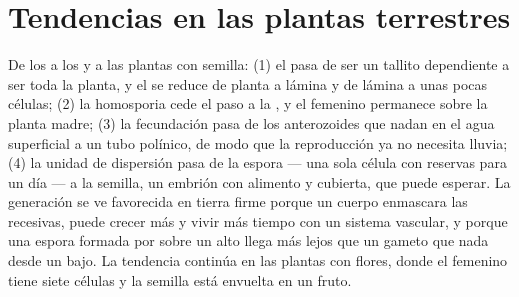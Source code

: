 \section{Tendencias en las plantas terrestres}

\begin{proposition}\label{prop:b2:plant-life-cycles:trends}
De los  a los  y a las plantas con semilla: (1) el
 pasa de ser un tallito dependiente a ser toda la planta, y el
 se reduce de planta a lámina y de lámina a unas pocas
células; (2) la homosporia cede el paso a la , y el
 femenino permanece sobre la planta madre; (3) la fecundación
pasa de los anterozoides que nadan en el agua superficial a un tubo
polínico, de modo que la reproducción ya no necesita lluvia; (4) la
unidad de dispersión pasa de la espora --- una sola célula con reservas
para un día --- a la semilla, un embrión con alimento y cubierta, que
puede esperar. La generación  se ve favorecida en tierra firme
porque un cuerpo  enmascara las  recesivas, puede
crecer más y vivir más tiempo con un sistema vascular, y porque una
espora formada por  sobre un  alto llega más lejos que
un gameto que nada desde un  bajo. La tendencia continúa en las
plantas con flores, donde el  femenino tiene siete células y la
semilla está envuelta en un fruto.
\end{proposition}

